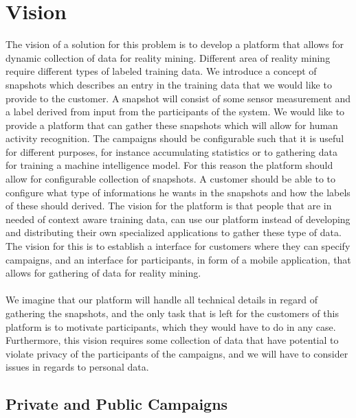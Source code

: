 \section{Vision}
\label{sec:vision}
The vision of a solution for this problem is to develop a platform that allows for dynamic collection of data for reality mining. Different area of reality mining require different types of labeled training data. We introduce a concept of snapshots which describes an entry in the training data that we would like to provide to the customer. A snapshot will consist of some sensor measurement and a label derived from input from the participants of the system. We would like to provide a platform that can gather these snapshots which will allow for human activity recognition. The campaigns should be configurable such that it is useful for different purposes, for instance accumulating statistics or to gathering data for training a machine intelligence model. For this reason the platform should allow for configurable collection of snapshots. A customer should be able to to configure what type of informations he wants in the snapshots and how the labels of these should derived. The vision for the platform is that people that are in needed of context aware training data, can use our platform instead of developing and distributing their own specialized applications to gather these type of data. The vision for this is to establish a interface for customers where they can specify campaigns, and an interface for participants, in form of a mobile application, that allows for gathering of data for reality mining.
\\\\
We imagine that our platform will handle all technical details in regard of gathering the snapshots, and the only task that is left for the customers of this platform is to motivate participants, which they would have to do in any case. Furthermore, this vision requires some collection of data that have potential to violate privacy of the participants of the campaigns, and we will have to consider issues in regards to personal data.

\subsection{Private and Public Campaigns}
\label{sub:private_and_public_campaigns}

